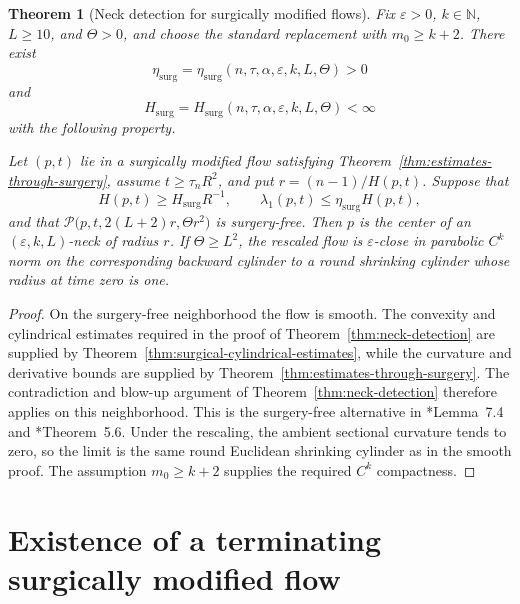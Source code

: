 \documentclass[11pt,reqno]{amsart}
\newtheorem{theorem}[proposition]{Theorem}
\theoremstyle{definition}
\theoremstyle{remark}
\numberwithin{equation}{section}
\newcommand{\eps}{\varepsilon}
\begin{document}
\begin{theorem}[Neck detection for surgically modified flows]
  \label{thm:surgical-neck-detection}
  Fix $\eps>0$, $k\in\mathbb N$, $L\geq10$, and $\Theta>0$, and choose
the standard replacement with $m_0\geq k+2$.  There exist
  \begin{equation*}
  \eta_{\mathrm{surg}}
  =
  \eta_{\mathrm{surg}}(n,\tau,\alpha,\eps,k,L,\Theta)>0
  \end{equation*}
  and
  \begin{equation*}
  H_{\mathrm{surg}}
  =
  H_{\mathrm{surg}}(n,\tau,\alpha,\eps,k,L,\Theta)<\infty
  \end{equation*}
  with the following property.

  Let $(p,t)$ lie in a surgically modified flow satisfying
  Theorem~\ref{thm:estimates-through-surgery}, assume
  $t\geq\tau_nR^2$, and put $r=(n-1)/H(p,t)$.  
  Suppose that
  \begin{equation*}
  H(p,t)\geq H_{\mathrm{surg}}R^{-1},
  \qquad
  \lambda_1(p,t)\leq\eta_{\mathrm{surg}}H(p,t),
  \end{equation*}
  and that $\mathcal P\bigl(p,t,2(L+2)r,\Theta r^2\bigr)$  
  is surgery-free.  Then $p$ is the center of an $(\eps,k,L)$-neck of
  radius $r$.  If $\Theta\geq L^2$, the rescaled flow is $\eps$-close in
  parabolic $C^k$ norm on the corresponding backward cylinder to a round
  shrinking cylinder whose radius at time zero is one.
\end{theorem}

\begin{proof}
  On the surgery-free neighborhood the flow is smooth.  The convexity and
  cylindrical estimates required in the proof of
  Theorem~\ref{thm:neck-detection} are supplied by
  Theorem~\ref{thm:surgical-cylindrical-estimates}, while the curvature and
  derivative bounds are supplied by
  Theorem~\ref{thm:estimates-through-surgery}.  The contradiction and
  blow-up argument of Theorem~\ref{thm:neck-detection} therefore applies on
  this neighborhood.  This is the surgery-free alternative in
  \cite{HS09}*{Lemma~7.4} and \cite{LN21}*{Theorem~5.6}.  Under the rescaling,
  the ambient sectional curvature tends to zero, so the limit is the same
  round Euclidean shrinking cylinder as in the smooth proof.  The assumption
  $m_0\geq k+2$ supplies the required $C^k$ compactness.
\end{proof}


\section{Existence of a terminating surgically modified flow}
\label{sec:parameter-choice}
\end{document}
